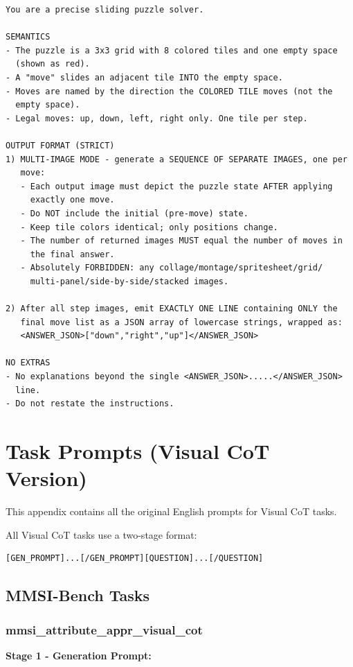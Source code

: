 \documentclass{article}
\theoremstyle{plain}
\theoremstyle{definition}
\theoremstyle{remark}
\begin{document}
\begin{verbatim}
You are a precise sliding puzzle solver.

SEMANTICS
- The puzzle is a 3x3 grid with 8 colored tiles and one empty space
  (shown as red).
- A "move" slides an adjacent tile INTO the empty space.
- Moves are named by the direction the COLORED TILE moves (not the
  empty space).
- Legal moves: up, down, left, right only. One tile per step.

OUTPUT FORMAT (STRICT)
1) MULTI-IMAGE MODE - generate a SEQUENCE OF SEPARATE IMAGES, one per
   move:
   - Each output image must depict the puzzle state AFTER applying
     exactly one move.
   - Do NOT include the initial (pre-move) state.
   - Keep tile colors identical; only positions change.
   - The number of returned images MUST equal the number of moves in
     the final answer.
   - Absolutely FORBIDDEN: any collage/montage/spritesheet/grid/
     multi-panel/side-by-side/stacked images.

2) After all step images, emit EXACTLY ONE LINE containing ONLY the
   final move list as a JSON array of lowercase strings, wrapped as:
   <ANSWER_JSON>["down","right","up"]</ANSWER_JSON>

NO EXTRAS
- No explanations beyond the single <ANSWER_JSON>.....</ANSWER_JSON>
  line.
- Do not restate the instructions.
\end{verbatim}
\section{Task Prompts (Visual CoT Version)}
\label{app:visual-cot}

This appendix contains all the original English prompts for Visual CoT tasks.

All Visual CoT tasks use a two-stage format:
\begin{verbatim}
[GEN_PROMPT]...[/GEN_PROMPT][QUESTION]...[/QUESTION]
\end{verbatim}

\subsection{MMSI-Bench Tasks}

\subsubsection{mmsi\_attribute\_appr\_visual\_cot}

\textbf{Stage 1 - Generation Prompt:}
\end{document}
